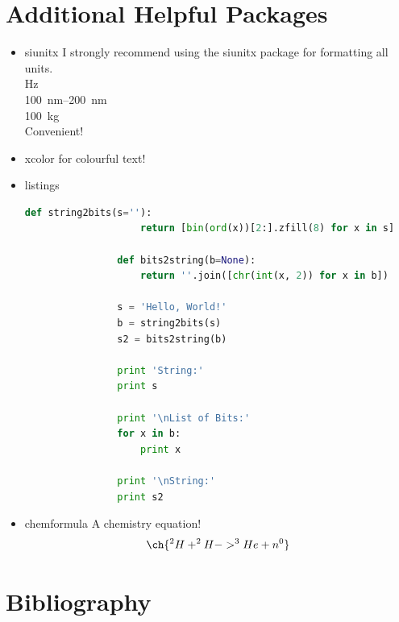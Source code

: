 \documentclass[hidelinks, 12pt]{article}%
\begin{document}
    \section{Additional Helpful Packages}
    \begin{itemize}
        \item siunitx
            I strongly recommend using the siunitx package for formatting all units.
            \\\si{\hertz}
            \\\SIrange{100}{200}{\nano\meter}
            \\\SI{100}{\kilo\gram}
            \\Convenient!
        \item xcolor
            for {\color{red}colourful} {\color{blue}text}!

        \item listings

            \begin{lstlisting}[language=python]
                def string2bits(s=''):
                    return [bin(ord(x))[2:].zfill(8) for x in s]

                def bits2string(b=None):
                    return ''.join([chr(int(x, 2)) for x in b])

                s = 'Hello, World!'
                b = string2bits(s)
                s2 = bits2string(b)

                print 'String:'
                print s

                print '\nList of Bits:'
                for x in b:
                    print x

                print '\nString:'
                print s2
            \end{lstlisting}

        \item chemformula
            A chemistry equation!
            \begin{equation}
               \ch{
                    ^{2}H + ^{2}H -> ^{3}He + n^{0}
                }
                \label{eqt:nucEnerReleased}
            \end{equation}
    \end{itemize}


    \section{Bibliography}
\end{document}
